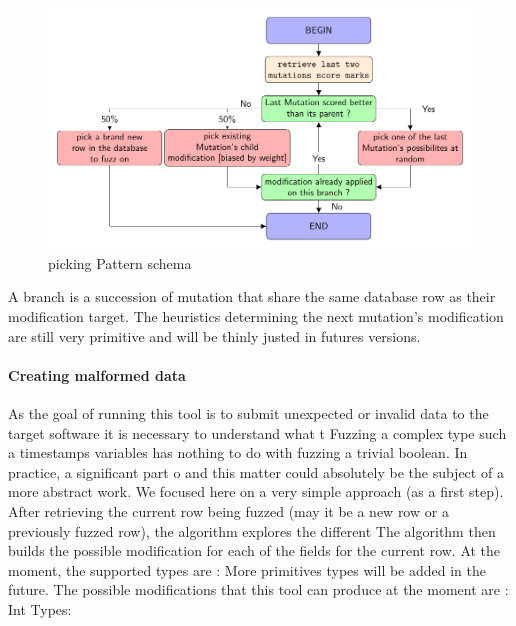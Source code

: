 \documentclass{article}
\begin{document}
\begin{empfile}
\begin{itemize}
\begin{figure}[h!]
\centering
\includegraphics[width=\textwidth]{pickingPaternDiagram.pdf}
\caption{picking Pattern schema}
\end{figure}				
				
				\end{itemize}
A branch is a succession of mutation that share the same database row as their modification target.
The heuristics determining the next mutation's modification are still very primitive and will be thinly justed in futures versions.								 
				\paragraph{Creating malformed data} 
As the goal of running this tool is to submit unexpected or invalid data to the target software it is necessary to understand what t
Fuzzing a complex type such a timestamps variables has nothing to do with fuzzing a trivial boolean. In practice, a significant part o
and this matter could absolutely be the subject of a more abstract work. We focused here on a very simple approach (as a first step).
After retrieving the current row being fuzzed (may it be a new row or a previously fuzzed row), the algorithm explores the different
The algorithm then builds the possible modification for each of the fields for the current row.
At the moment, the supported types are : %
More primitives types will be added in the future.
The possible modifications that this tool can produce at the moment are : \\ %
				Int Types:
				\begin{itemize}
		

\end{itemize}
\end{empfile}
\end{document}
